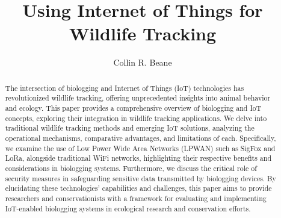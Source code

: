 \documentclass[sigplan,screen,nonacm]{acmart}
\begin{document}
\title{Using Internet of Things for Wildlife Tracking}

\author{Collin R. Beane}

\begin{abstract}
  

  The intersection of biologging and Internet of Things (IoT) technologies has revolutionized wildlife tracking, 
  offering unprecedented insights into animal behavior and ecology. This paper provides a comprehensive overview 
  of biologging and IoT concepts, exploring their integration in wildlife tracking applications. We delve into 
  traditional wildlife tracking methods and emerging IoT solutions, analyzing the operational mechanisms, comparative 
  advantages, and limitations of each. Specifically, we examine the use of Low Power Wide Area Networks (LPWAN) such 
  as SigFox and LoRa, alongside traditional WiFi networks, highlighting their respective benefits and considerations 
  in biologging systems. Furthermore, we discuss the critical role of security measures in safeguarding sensitive data 
  transmitted by biologging devices. By elucidating these technologies' capabilities and challenges, this paper aims 
  to provide researchers and conservationists with a framework for evaluating and implementing IoT-enabled biologging 
  systems in ecological research and conservation efforts.
\end{abstract}
\end{document}
